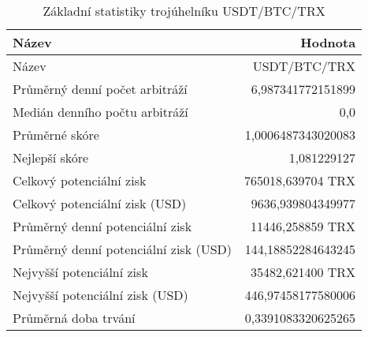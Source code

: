 \begin{table}\centering
\caption{Základní statistiky trojúhelníku USDT/BTC/TRX}
\label{USDTBTCTRX_stats}
\begin{tabular}{|| l | r ||}
\hline Název & Hodnota \\ 
\hline\hline Název & USDT/BTC/TRX \\ 
\hline Průměrný denní počet arbitráží & 6,987341772151899 \\ 
\hline Medián denního počtu arbitráží & 0,0 \\ 
\hline Průměrné skóre & 1,0006487343020083 \\ 
\hline Nejlepší skóre & 1,081229127 \\ 
\hline Celkový potenciální zisk & 765018,639704 TRX \\ 
\hline Celkový potenciální zisk (USD) & 9636,939804349977 \\ 
\hline Průměrný denní potenciální zisk & 11446,258859 TRX \\ 
\hline Průměrný denní potenciální zisk (USD) & 144,18852284643245 \\ 
\hline Nejvyšší potenciální zisk & 35482,621400 TRX \\ 
\hline Nejvyšší potenciální zisk (USD) & 446,97458177580006 \\ 
\hline Průměrná doba trvání & 0,3391083320625265 \\ 
\hline
\end{tabular}
\end{table}